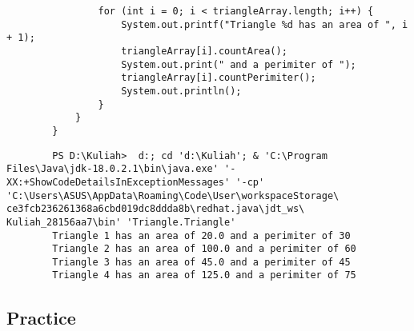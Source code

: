 \documentclass[12pt,titlepage]{article}
\begin{document}
\begin{enumerate}
\begin{verbatim}
                for (int i = 0; i < triangleArray.length; i++) {
                    System.out.printf("Triangle %d has an area of ", i + 1);
                    triangleArray[i].countArea();
                    System.out.print(" and a perimiter of ");
                    triangleArray[i].countPerimiter();
                    System.out.println();
                }
            }
        }
    \end{verbatim}
    \begin{verbatim}
        PS D:\Kuliah>  d:; cd 'd:\Kuliah'; & 'C:\Program Files\Java\jdk-18.0.2.1\bin\java.exe' '-XX:+ShowCodeDetailsInExceptionMessages' '-cp' 'C:\Users\ASUS\AppData\Roaming\Code\User\workspaceStorage\ ce3fcb236261368a6cbd019dc8ddda8b\redhat.java\jdt_ws\ Kuliah_28156aa7\bin' 'Triangle.Triangle' 
        Triangle 1 has an area of 20.0 and a perimiter of 30 
        Triangle 2 has an area of 100.0 and a perimiter of 60
        Triangle 3 has an area of 45.0 and a perimiter of 45 
        Triangle 4 has an area of 125.0 and a perimiter of 75
    \end{verbatim}
\end{enumerate}

\subsection{Practice}
\end{document}
